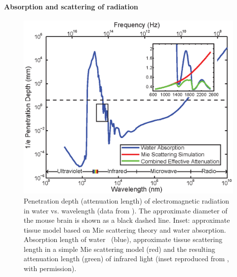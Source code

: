 \paragraph{Absorption and scattering of radiation}

\begin{figure}[htbp]
\caption{%
Penetration depth (attenuation length) of electromagnetic radiation in water vs. wavelength (data from \cite{jonasz07}).
The approximate diameter of the mouse brain is shown as a black dashed line.
Inset: approximate tissue model based on Mie scattering theory and water absorption. Absorption length of water~\cite{kou93} (blue), approximate tissue scattering length in a simple Mie scattering model (red) and the resulting attenuation length (green) of infrared light (inset reproduced from \cite{kou93}, with permission).}
\label{fig:attenuation}
\centering
\includegraphics[width=0.65\linewidth]{figs/Fig2.eps}
\end{figure}

